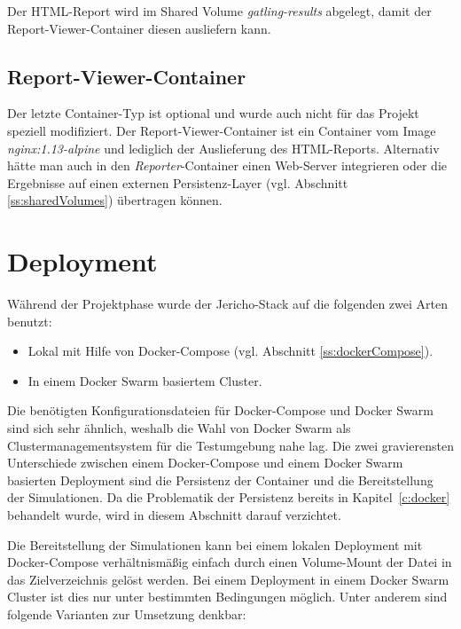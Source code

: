 Der HTML-Report wird im Shared Volume \textit{gatling-results} abgelegt, damit der Report-Viewer-Container diesen ausliefern kann.

\subsection{Report-Viewer-Container}

Der letzte Container-Typ ist optional und wurde auch nicht f\"ur das Projekt speziell modifiziert.
Der Report-Viewer-Container ist ein Container vom Image \textit{nginx:1.13-alpine} und lediglich der Auslieferung des HTML-Reports.
Alternativ h\"atte man auch in den \textit{Reporter}-Container einen Web-Server integrieren oder die Ergebnisse auf einen externen Persistenz-Layer (vgl. Abschnitt \ref{ss:sharedVolumes}) \"ubertragen k\"onnen.

\section{Deployment}

W\"ahrend der Projektphase wurde der \glqq{}Jericho-Stack\grqq{} auf die folgenden zwei Arten benutzt:

\begin{itemize}
	\item Lokal mit Hilfe von Docker-Compose (vgl. Abschnitt \ref{ss:dockerCompose}).
	\item In einem Docker Swarm basiertem Cluster.
\end{itemize}

Die ben\"otigten Konfigurationsdateien f\"ur Docker-Compose und Docker Swarm sind sich sehr \"ahnlich, weshalb die Wahl von Docker Swarm als Clustermanagementsystem f\"ur die Testumgebung nahe lag.
Die zwei gravierensten Unterschiede zwischen einem Docker-Compose und einem Docker Swarm basierten Deployment sind die Persistenz der Container und die Bereitstellung der Simulationen.
Da die Problematik der Persistenz bereits in Kapitel~\ref{c:docker} behandelt wurde, wird in diesem Abschnitt darauf verzichtet.

Die Bereitstellung der Simulationen kann bei einem lokalen Deployment mit Docker-Compose verh\"altnism\"a\ss{}ig einfach durch einen Volume-Mount der Datei in das Zielverzeichnis gel\"ost werden.
Bei einem Deployment in einem Docker Swarm Cluster ist dies nur unter bestimmten Bedingungen m\"oglich.
Unter anderem sind folgende Varianten zur Umsetzung denkbar:

